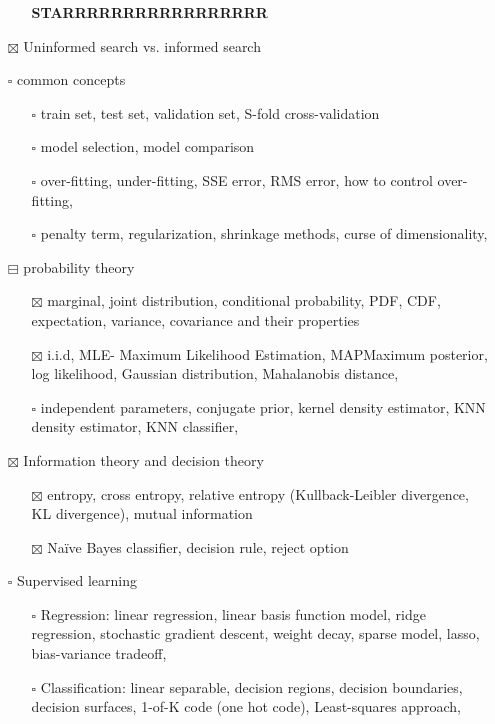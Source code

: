 \documentclass[11pt]{article}
\begin{document}
\begin{itemize}
\begin{itemize}
\textbf{STARRRRRRRRRRRRRRRRR}
\end{itemize}
\item[{$\boxtimes$}] Uninformed search vs. informed search
\item[{$\square$}] common concepts
\begin{itemize}
\item[{$\square$}] train set, test set, validation set, S-fold cross-validation
\item[{$\square$}] model selection, model comparison
\item[{$\square$}] over-fitting, under-fitting, SSE error, RMS error, how to control over-fitting,
\item[{$\square$}] penalty term, regularization, shrinkage methods, curse of dimensionality,
\end{itemize}
\item[{$\boxminus$}] probability theory
\begin{itemize}
\item[{$\boxtimes$}] marginal, joint distribution, conditional probability, PDF, CDF, expectation, variance,
covariance and their properties
\item[{$\boxtimes$}] i.i.d, MLE- Maximum Likelihood Estimation, MAPMaximum posterior, log
likelihood, Gaussian distribution, Mahalanobis distance,
\item[{$\square$}] independent parameters, conjugate prior, kernel density estimator, KNN density
estimator, KNN classifier,
\end{itemize}
\item[{$\boxtimes$}] Information theory and decision theory
\begin{itemize}
\item[{$\boxtimes$}] entropy, cross entropy, relative entropy (Kullback-Leibler divergence, KL divergence),
mutual information
\item[{$\boxtimes$}] Naïve Bayes classifier, decision rule, reject option
\end{itemize}
\item[{$\square$}] Supervised learning
\begin{itemize}
\item[{$\square$}] Regression: linear regression, linear basis function model, ridge regression,
stochastic gradient descent, weight decay, sparse model, lasso,
bias-variance tradeoff,
\item[{$\square$}] Classification: linear separable, decision regions, decision boundaries,
decision surfaces, 1-of-K code (one hot code), Least-squares approach,

\end{itemize}
\end{itemize}
\end{document}
